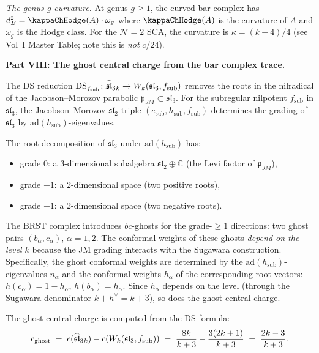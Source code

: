 \begin{computation}
\emph{The genus-$g$ curvature.}
At genus $g\ge 1$, the curved bar complex has
$d_B^2 = \kappaChHodge(A)\cdot\omega_g$ where
$\kappaChHodge(A)$ is the curvature of $A$ and $\omega_g$ is the
Hodge class. For the $\mathcal N=2$ SCA, the curvature is
$\kappa = (k+4)/4$ (see Vol~I Master Table; note this is \emph{not} $c/24$).

\medskip
\noindent\textbf{Part VIII: The ghost central charge from the
bar complex trace.}

The DS reduction
$\mathrm{DS}_{f_{\mathrm{sub}}}\colon
\widehat{\mathfrak{sl}}_3{}_k \to W_k(\mathfrak{sl}_3,f_{\mathrm{sub}})$
removes the roots in the nilradical of the
Jacobson--Morozov parabolic $\mathfrak p_{JM}
\subset\mathfrak{sl}_3$. For the subregular nilpotent
$f_{\mathrm{sub}}$ in $\mathfrak{sl}_3$, the
Jacobson--Morozov $\mathfrak{sl}_2$-triple
$(e_{\mathrm{sub}}, h_{\mathrm{sub}}, f_{\mathrm{sub}})$
determines the grading of $\mathfrak{sl}_3$ by
$\mathrm{ad}(h_{\mathrm{sub}})$-eigenvalues.

The root decomposition of $\mathfrak{sl}_3$ under
$\mathrm{ad}(h_{\mathrm{sub}})$ has:
\begin{itemize}
\item grade $0$: a $3$-dimensional subalgebra
$\mathfrak{sl}_2\oplus\mathbb C$ (the Levi factor of
$\mathfrak p_{JM}$),
\item grade $+1$: a $2$-dimensional space (two positive roots),
\item grade $-1$: a $2$-dimensional space (two negative roots).
\end{itemize}
The BRST complex introduces $bc$-ghosts for the grade-$\ge 1$
directions: two ghost pairs $(b_\alpha, c_\alpha)$,
$\alpha=1,2$. The conformal weights of these ghosts
\emph{depend on the level $k$} because the JM grading
interacts with the Sugawara construction. Specifically,
the ghost conformal weights are determined by the
$\mathrm{ad}(h_{\mathrm{sub}})$-eigenvalues $n_\alpha$
and the conformal weights $h_\alpha$ of the
corresponding root vectors:
$h(c_\alpha) = 1 - h_\alpha$, $h(b_\alpha) = h_\alpha$.
Since $h_\alpha$ depends on the level (through the
Sugawara denominator $k+h^\vee = k+3$), so does the
ghost central charge.

The ghost central charge is computed from the DS formula:
\begin{equation}\label{eq:c-ghost-subregular}
c_{\mathrm{ghost}}
\;=\;
c(\widehat{\mathfrak{sl}}_3{}_k) - c(W_k(\mathfrak{sl}_3,f_{\mathrm{sub}}))
\;=\;
\frac{8k}{k+3} - \frac{3(2k+1)}{k+3}
\;=\;
\frac{2k-3}{k+3}.
\end{equation}


\end{computation}
